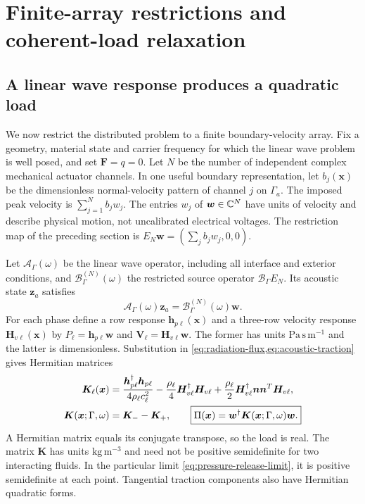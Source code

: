 \section{Finite-array restrictions and coherent-load relaxation}\label{sec:inverse}

\subsection{A linear wave response produces a quadratic load}
We now restrict the distributed problem to a finite boundary-velocity array.
Fix a geometry, material state and carrier frequency for which the linear wave
problem is well posed, and set $\bm F=q=0$. Let $N$ be the number of independent complex mechanical
actuator channels. In one useful boundary representation, let $b_j(\bm x)$ be
the dimensionless normal-velocity pattern of channel $j$ on $\Gamma_a$.
The imposed peak velocity is $\sum_{j=1}^N b_jw_j$. The entries $w_j$ of
$\bm w\in\mathbb C^N$ have units of velocity and describe physical motion, not
uncalibrated electrical voltages. The restriction map of the preceding section
is $E_N\bm w=(\sum_jb_jw_j,0,0)$.

Let $\mathcal A_\Gamma(\omega)$ be the linear wave operator, including all
interface and exterior conditions, and $\mathcal B^{(N)}_\Gamma(\omega)$ the restricted source operator $\mathcal B_\Gamma E_N$. Its acoustic state $\bm z_a$ satisfies
\begin{equation}
 \mathcal A_\Gamma(\omega)\bm z_a
       =\mathcal B^{(N)}_\Gamma(\omega)\bm w.
 \label{eq:wave-operator}
\end{equation}
For each phase define a row response $\bm h_{p\ell}(\bm x)$ and a three-row
velocity response $\bm H_{v\ell}(\bm x)$ by
$P_\ell=\bm h_{p\ell}\bm w$ and
$\bm V_\ell=\bm H_{v\ell}\bm w$. The former has units
$\mathrm{Pa\,s\,m^{-1}}$ and the latter is dimensionless. Substitution in
\cref{eq:radiation-flux,eq:acoustic-traction} gives Hermitian matrices
\begin{align}
 \bm K_\ell(\bm x)&=
 \frac{\bm h_{p\ell}^\dagger\bm h_{p\ell}}{4\rho_\ell c_\ell^2}
 -\frac{\rho_\ell}{4}\bm H_{v\ell}^\dagger\bm H_{v\ell}
 +\frac{\rho_\ell}{2}\bm H_{v\ell}^\dagger\bm n\bm n^T\bm H_{v\ell},\\
 \bm K(\bm x;\Gamma,\omega)&=\bm K_- -\bm K_+,\qquad
 \boxed{\Pi(\bm x)=\bm w^\dagger\bm K(\bm x;\Gamma,\omega)\bm w.}
 \label{eq:quadratic-load}
\end{align}
A Hermitian matrix equals its conjugate transpose, so the load is real.
The matrix $\bm K$ has units $\mathrm{kg\,m^{-3}}$ and need not be positive
semidefinite for two interacting fluids. In the particular limit
\cref{eq:pressure-release-limit}, it is positive semidefinite at each point.
Tangential traction components also have Hermitian quadratic forms.

